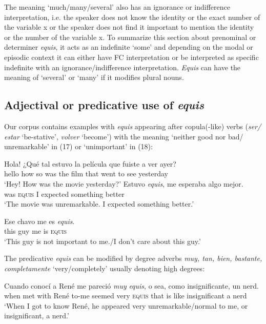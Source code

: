 \documentclass[output=paper]{langsci/langscibook}
\begin{document}
The meaning ‘much/many/several’ also has an ignorance or indifference interpretation, i.e. the speaker does not know the identity or the exact number of the variable x or the speaker does not find it important to mention the identity or the number of the variable x.
To summarize this section about prenominal or determiner \textit{equis}, it acts as an indefinite ‘some’ and depending on the modal or episodic context it can either have FC interpretation or be interpreted as specific indefinite with an ignorance/indifference interpretation. \textit{Equis} can have the meaning of ‘several’ or ‘many’ if it modifies plural nouns.

\subsection{Adjectival or predicative use of \textit{equis}}\label{sec:kellert:2.2}
Our corpus contains examples with \textit{equis} appearing after copula(-like) verbs (\textit{ser/ estar} ‘be-stative’, \textit{volver} ‘become’) with the meaning ‘neither good nor bad/ unremarkable’ in (17) or ‘unimportant’ in (18):

\ea
\begin{xlist}
Hola! {¿}Qué tal estuvo la película que fuiste a ver ayer?\\
hello how so was the film that went to see yesterday\\
\glt `Hey! How was the movie yesterday?'
\gll  Estuvo \textit{equis}, me esperaba algo mejor.\\
was \textsc{equis} I expected something better\\
\glt `The movie was unremarkable. I expected something better.’
\end{xlist}
\z

\ea
\gll  Ese chavo me es \textit{equis}.\\
this guy me is \textsc{equis}\\
\glt ‘This guy is not important to me./I don’t care about this guy.’
\z

The predicative \textit{equis} can be modified by degree adverbs \textit{muy, tan, bien, bastante, completamente} ‘very/completely’ usually denoting high degrees:

\ea
\gll Cuando conocí a René me pareció \textit{muy} \textit{equis}, o sea, como insignificante, un nerd.\\
when met with René to-me seemed very \textsc{equis} that is like insignificant a nerd\\
\glt ‘When I got to know René, he appeared very unremarkable/normal to me, or insignificant, a nerd.’
\z
\end{document}
